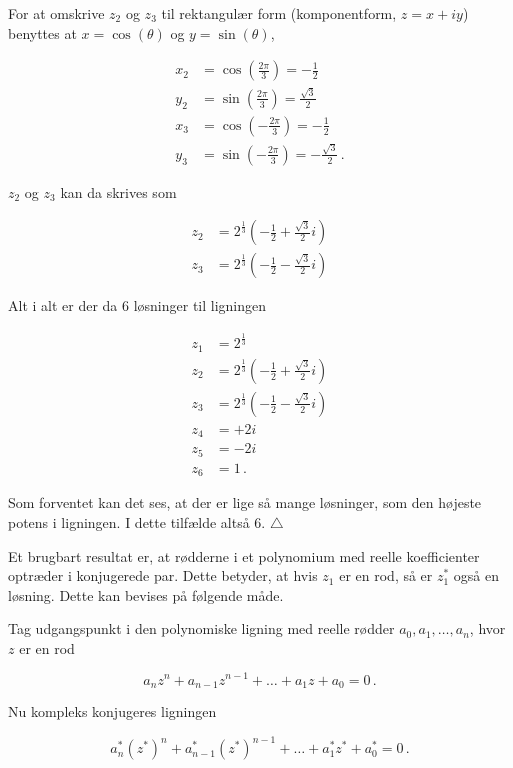 \documentclass[a4paper, 12pt,titlepage]{article}
\begin{document}
For at omskrive \(z_2\) og \(z_3\) til rektangulær form (komponentform, \(z=x+iy\)) benyttes at \(x=\cos(\theta)\) og \(y=\sin(\theta)\),

\begin{align*}
    x_2 &= \cos\left(\frac{2 \pi}{3}\right) = - \frac{1}{2} \\
    y_2 &= \sin\left(\frac{2 \pi}{3}\right) = \frac{\sqrt{3}}{2} \\
    x_3 &= \cos\left(-\frac{2 \pi}{3}\right) = - \frac{1}{2} \\
    y_3 &= \sin\left(-\frac{2 \pi}{3}\right) = - \frac{\sqrt{3}}{2} \,.
\end{align*}

\(z_2\) og \(z_3\) kan da skrives som

\begin{align*}
    z_2 &= 2^{\frac{1}{3}} \left( -\frac{1}{2} + \frac{\sqrt{3}}{2} i \right) \\
    z_3 &= 2^{\frac{1}{3}} \left( -\frac{1}{2} - \frac{\sqrt{3}}{2} i \right) 
\end{align*}

Alt i alt er der da 6 løsninger til ligningen

\begin{align*}
    z_1 &= 2^{\frac{1}{3}} \\
    z_2 &= 2^{\frac{1}{3}} \left( -\frac{1}{2} + \frac{\sqrt{3}}{2} i \right) \\
    z_3 &= 2^{\frac{1}{3}} \left( -\frac{1}{2} - \frac{\sqrt{3}}{2} i \right) \\
    z_4 &= + 2 i \\
    z_5 &= - 2 i \\
    z_6 &= 1 \,.
\end{align*}

Som forventet kan det ses, at der er lige så mange løsninger, som den højeste potens i ligningen. I dette tilfælde altså 6. \(\triangle\)

Et brugbart resultat er, at rødderne i et polynomium med reelle koefficienter optræder i konjugerede par. Dette betyder, at hvis \(z_1\) er en rod, så er \(z^*_1\) også en løsning. Dette kan bevises på følgende måde. 

Tag udgangspunkt i den polynomiske ligning med reelle rødder \(a_0, a_1,\dots,a_n\), hvor \(z\) er en rod

$$a_n z^n + a_{n-1} z^{n-1} + \dots + a_1 z +a_0 =0\,.$$

Nu kompleks konjugeres ligningen

$$a_n^* (z^*)^n + a^*_{n-1} (z^*)^{n-1} + \dots + a^*_1 z^* +a^*_0 =0\,.$$
\end{document}
